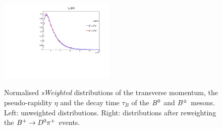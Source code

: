 \begin{figure}[t]
\begin{center}
   \includegraphics[width=0.49\textwidth]{AA-Appdx-OSTaggers/figs/BTAU_BuVSBd_Weighted.pdf} \\
  \end{center}
  \vspace{-2mm}
  \caption{Normalised \emph{sWeighted} distributions of the transverse momentum, the pseudo-rapidity $\eta$ and the decay time $\tau_{B}$ of the $B^0$ and $B^\pm$ mesons. Left: unweighted distributions. Right: distributions after reweighting the $B^+\rightarrow D^0\pi^+$ events.}
  \label{fig:reweightingOSgb1}
\end{figure}
